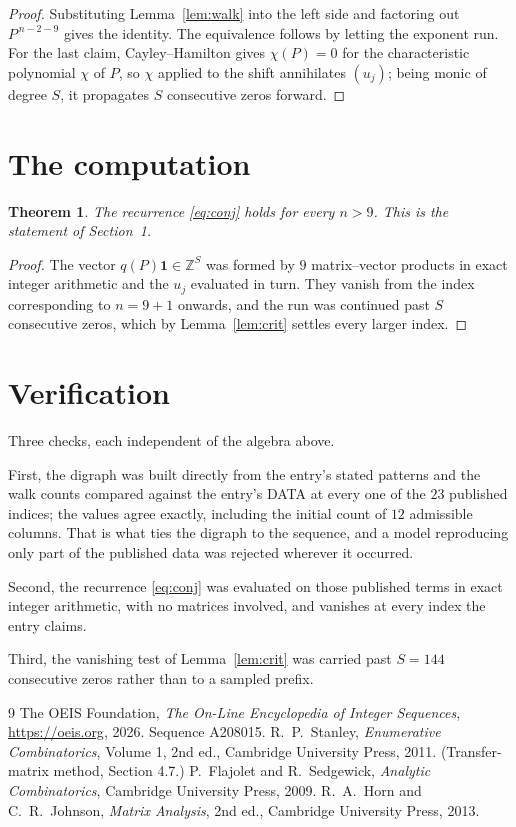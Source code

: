 \documentclass[11pt,a4paper]{article}
\theoremstyle{plain}
\newtheorem{theorem}{Theorem}
\theoremstyle{definition}
\begin{document}
\begin{proof}
Substituting Lemma~\ref{lem:walk} into the left side and factoring out
$P^{\,n-2-9}$ gives the identity. The equivalence follows by letting the exponent
run. For the last claim, Cayley--Hamilton gives $\chi(P)=0$ for the characteristic
polynomial $\chi$ of $P$, so $\chi$ applied to the shift annihilates $(u_j)$; being monic of
degree $S$, it propagates $S$ consecutive zeros forward.
\end{proof}

\section{The computation}

\begin{theorem}
The recurrence \eqref{eq:conj} holds for every $n>9$. This is the statement of
Section~1.
\end{theorem}

\begin{proof}
The vector $q(P)\mathbf{1}\in\mathbb{Z}^{S}$ was formed by $9$ matrix--vector
products in exact integer arithmetic and the $u_j$ evaluated in turn. They vanish from the
index corresponding to $n=9+1$ onwards, and the run was continued past $S$ consecutive
zeros, which by Lemma~\ref{lem:crit} settles every larger index.
\end{proof}

\section{Verification}

Three checks, each independent of the algebra above.

First, the digraph was built directly from the entry's stated patterns and the walk counts
compared against the entry's DATA at every one of the $23$ published indices; the
values agree exactly, including the initial count of $12$ admissible columns. That is
what ties the digraph to the sequence, and a model reproducing only part of the published
data was rejected wherever it occurred.

Second, the recurrence \eqref{eq:conj} was evaluated on those published terms in exact
integer arithmetic, with no matrices involved, and vanishes at every index the entry claims.

Third, the vanishing test of Lemma~\ref{lem:crit} was carried past $S=144$ consecutive
zeros rather than to a sampled prefix.

\begin{thebibliography}{9}
 The OEIS Foundation, \emph{The On-Line Encyclopedia of Integer
Sequences}, \url{https://oeis.org}, 2026. Sequence A208015.
 R.~P.~Stanley, \emph{Enumerative Combinatorics}, Volume 1, 2nd ed.,
Cambridge University Press, 2011. (Transfer-matrix method, Section 4.7.)
 P.~Flajolet and R.~Sedgewick, \emph{Analytic Combinatorics}, Cambridge
University Press, 2009.
 R.~A.~Horn and C.~R.~Johnson, \emph{Matrix Analysis}, 2nd ed., Cambridge
University Press, 2013.
\end{thebibliography}
\end{document}
